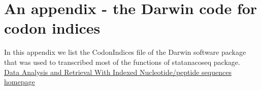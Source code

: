 \appendix
\chapter{An appendix - the Darwin code for codon indices}
In this appendix we list the CodonIndices file of the Darwin software package that was used to transcribed most of the functions of statanacoseq package. \\
\href{http://www.cbrg.ethz.ch/darwin}{ Data Analysis and Retrieval With Indexed Nucleotide/peptide sequences homepage} \\

  
